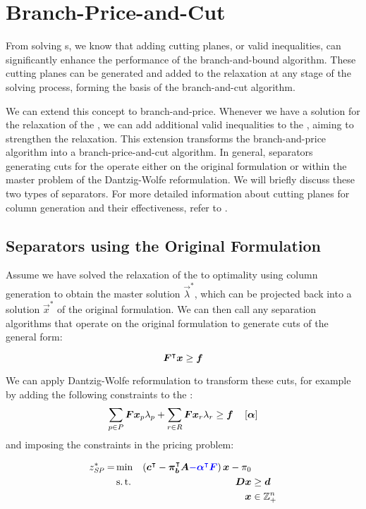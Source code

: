 \section{Branch-Price-and-Cut}\label{sec:cg_bp_bpc}
From solving \IP{}s, we know that adding cutting planes, or valid inequalities, can significantly enhance the performance of the branch-and-bound algorithm. These cutting planes can be generated and added to the \LP{} relaxation at any stage of the solving process, forming the basis of the branch-and-cut algorithm.

We can extend this concept to branch-and-price. Whenever we have a solution for the \LP{} relaxation of the \MP{}, we can add additional valid inequalities to the \RMP{}, aiming to strengthen the relaxation. This extension transforms the branch-and-price algorithm into a branch-price-and-cut algorithm. In general, separators generating cuts for the \MP{} operate either on the original formulation or within the master problem of the Dantzig-Wolfe reformulation. We will briefly discuss these two types of separators. For more detailed information about cutting planes for column generation and their effectiveness, refer to \cite{gamrath2010generic, witt2013separation}.

\subsection{Separators using the Original Formulation}
Assume we have solved the \LP{} relaxation of the \MP{} to optimality using column generation to obtain the master solution $\vec{\lambda}^*$, which can be projected back into a solution $\vec{x}^*$ of the original formulation. We can then call any separation algorithms that operate on the original formulation to generate cuts of the general form:

\begin{equation}
{\bm{F}}^\intercal {\bm{x}} \geq {\bm{f}}
\end{equation}

We can apply Dantzig-Wolfe reformulation to transform these cuts, for example by adding the following constraints to the \MP{}:
\begin{equation}
\sum_{p \in P} {\bm{F}} {\bm{x}}_p \lambda_p + \sum_{r \in R} {\bm{F}} {\bm{x}}_r \lambda_r \geq {\bm{f}} \quad \left[ {\bm{\alpha}} \right]
\end{equation}
and imposing the constraints in the pricing problem:

\begin{equation}
\begin{aligned}
z^*_\SP{} = &\min & \left( \vec{c}\transpose - \vec{\pi}_\vec{b}\transpose \mat{A} {\color{blue} - \vec{\alpha}\transpose \mat{F}}\right) \vec{x} - \pi_0 & \\
&\st & \mat{D} \vec{x} & \geq \vec{d} \\
&& \vec{x} & \in \mathbb{Z}_+^n
\end{aligned}
\end{equation}

